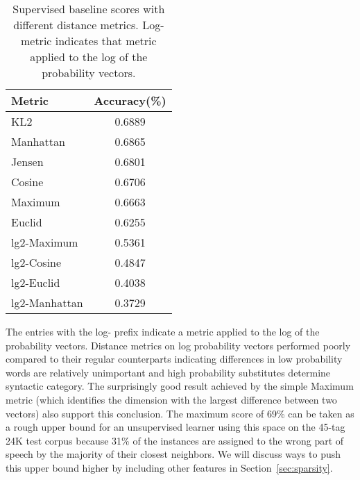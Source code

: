 \begin{table}[ht] \centering
\begin{tabular}{|l|c|}
\hline
Metric & Accuracy(\%) \\
\hline
KL2 & 0.6889 \\
Manhattan & 0.6865 \\
Jensen & 0.6801 \\
Cosine & 0.6706 \\
Maximum & 0.6663 \\
Euclid & 0.6255 \\
lg2-Maximum & 0.5361 \\
lg2-Cosine & 0.4847 \\
lg2-Euclid & 0.4038 \\
lg2-Manhattan & 0.3729 \\
\hline
\end{tabular}
\caption{Supervised baseline scores with different distance metrics.
  Log-metric indicates that metric applied to the log of the
  probability vectors.}
\label{tab:distscores}
\end{table}



The entries with the log- prefix indicate a metric applied to the log
of the probability vectors.  Distance metrics on log probability
vectors performed poorly compared to their regular counterparts
indicating differences in low probability words are relatively
unimportant and high probability substitutes determine syntactic
category.  The surprisingly good result achieved by the simple Maximum
metric (which identifies the dimension with the largest difference
between two vectors) also support this conclusion.  The maximum score
of 69\% can be taken as a rough upper bound for an unsupervised
learner using this space on the 45-tag 24K test corpus because 31\% of
the instances are assigned to the wrong part of speech by the majority
of their closest neighbors.  We will discuss ways to push this upper
bound higher by including other features in
Section~\ref{sec:sparsity}.


